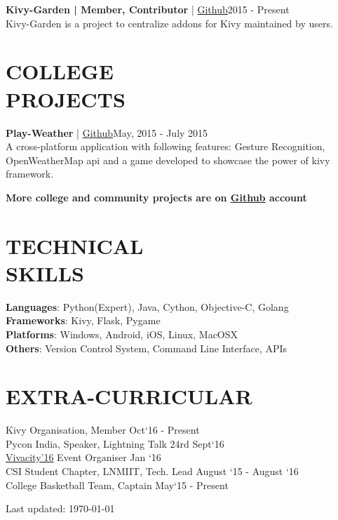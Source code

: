 \documentclass[margin]{res}
\begin{document}
\begin{resume}
{{    {\textbf{Kivy-Garden | Member, Contributor}  | \href{https://github.com/kivy-garden/garden.swipetodelete}{ Github}\hfill 2015 - Present \\
    Kivy-Garden is a project to centralize addons for Kivy maintained by users.\


\section{COLLEGE \\ PROJECTS}
    
    {\textbf{Play-Weather} | \href{https://github.com/kiok46/Play-Weather}{ Github}\hfill May, 2015 - July 2015 \\
    A cross-platform application with following features: Gesture Recognition, OpenWeatherMap api and a game developed to showcase the power of kivy framework.
    


     \textbf{More college and community projects are on \href{https://github.com/kiok46}{Github} account}

    
\section{TECHNICAL \\ SKILLS} {\textbf{Languages}:} Python(Expert), Java, Cython, Objective-C, Golang\\
    {\textbf{Frameworks}:} Kivy, Flask, Pygame\\
    {\textbf{Platforms}:} Windows, Android, iOS, Linux, MacOSX \\
    {\textbf{Others}:} Version Control System, Command Line Interface, APIs

\section{EXTRA-CURRICULAR\\ }
    {Kivy Organisation,} Member \hfill  Oct`16 - Present\\
    {Pycon India, Speaker,} Lightning Talk \hfill  24rd Sept`16\\
    \href{http://vivacity.lnmiit.ac.in/events.php}{Vivacity'16} Event Organiser \hfill Jan `16\\
    {CSI Student Chapter, LNMIIT,} Tech. Lead \hfill August `15 - August `16\\
    {College Basketball Team,} Captain \hfill  May`15 - Present\\

\begin{center}
  \begin{footnotesize}
    Last updated: \today \\
  \end{footnotesize}
\end{center}
}
}
}
}
\end{resume}
\end{document}
